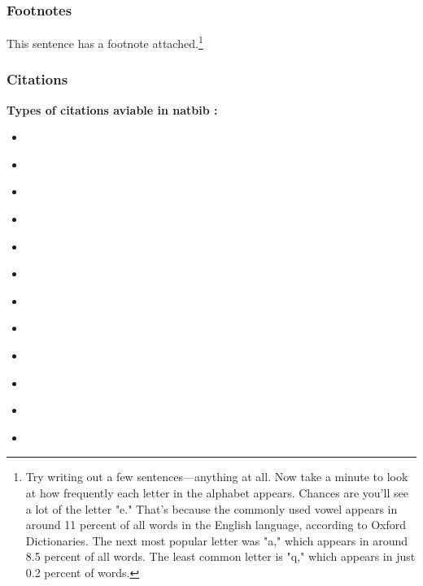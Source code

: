 \vspace{0.5cm}

\subsubsection{Footnotes}
\label{sssec:footnotes}

\lipsum[1-2]

This sentence has a footnote attached.\footnote{Try writing out a few
	sentences—anything at all. Now take a minute to look at how frequently each
	letter in the alphabet appears.  Chances are you'll see a lot of the letter
	"e." That's because the commonly used vowel appears in around 11 percent of
	all words in the English language, according to Oxford Dictionaries. The
	next most popular letter was "a," which appears in around 8.5 percent of all
	words. The least common letter is "q," which appears in just 0.2 percent of
	words.}


\subsubsectionend

\vspace{0.5cm}

\subsubsection{Citations}
\label{sssec:citations}

\textbf{Types of citations aviable in natbib :}


\begin{itemize}[noitemsep]

	\item \cite{einstein}
	\item \citeauthor{einstein}
	\item \citeauthor*{einstein}
	\item \citeyear{einstein}
	\item \citeyearpar{einstein}
	\item \citet{einstein} 
	\item \citet*{einstein} 
	\item \citet[chap. ~2]{einstein} 
	\item \citep{einstein} 
	\item \citep*{einstein} 
	\item \citep[see][]{einstein} 
	\item \citep[see][chap. ~2]{einstein}

\end{itemize}

